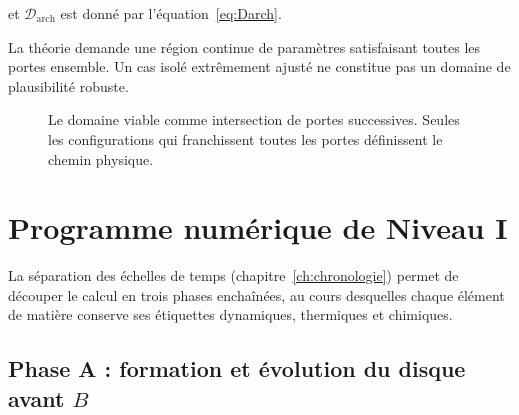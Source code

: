 \documentclass[11pt,a4paper,openany]{report}
\begin{document}
et $\mathcal{D}_{\mathrm{arch}}$ est donné par l'équation~\eqref{eq:Darch}.

\begin{falsif}
La théorie demande une région continue de paramètres satisfaisant toutes les portes ensemble.
Un cas isolé extrêmement ajusté ne constitue pas un domaine de plausibilité robuste.
\end{falsif}


\begin{figure}[htbp]
\centering
{}
\caption{Le domaine viable comme intersection de portes successives. Seules les configurations
qui franchissent toutes les portes définissent le chemin physique.}
\label{fig:portes}
\end{figure}

\chapter{Programme numérique de Niveau I}
\label{ch:programme}

La séparation des échelles de temps (chapitre~\ref{ch:chronologie}) permet de découper le calcul en
trois phases enchaînées, au cours desquelles chaque élément de matière conserve ses étiquettes
dynamiques, thermiques et chimiques.

\section{Phase A : formation et évolution du disque avant \texorpdfstring{$B$}{B}}
\end{document}
